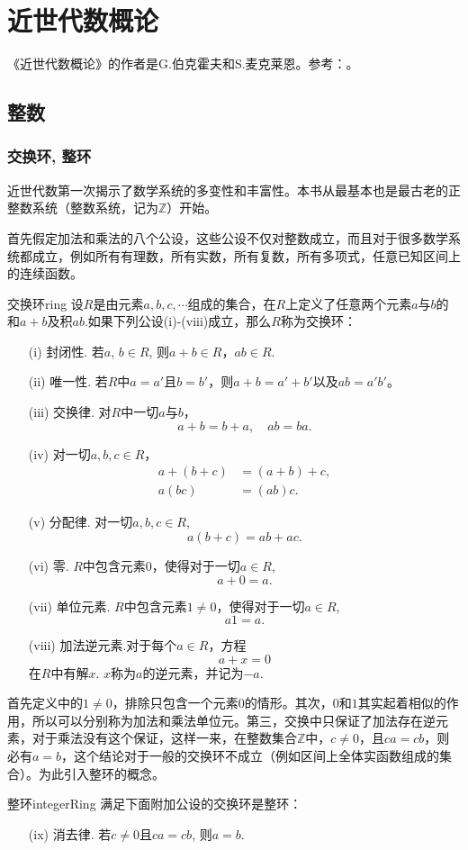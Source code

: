 \chapter{近世代数概论}
《近世代数概论》的作者是G.伯克霍夫和S.麦克莱恩。参考：\cite{surveyofmodernalgebra1979}。

\section{整数}
\subsection{交换环, 整环}
近世代数第一次揭示了数学系统的多变性和丰富性。本书从最基本也是最古老的正整数系统（整数系统，记为$\mathbb{Z}$）开始。

首先假定加法和乘法的八个公设，这些公设不仅对整数成立，而且对于很多数学系统都成立，例如所有有理数，所有实数，所有复数，所有多项式，任意已知区间上的连续函数。

\begin{definition}{交换环}{ring} 
设$R$是由元素$a,b,c,\cdots$组成的集合，在$R$上定义了任意两个元素$a$与$b$的和$a+b$及积$ab$.如果下列公设(i)-(viii)成立，那么$R$称为交换环：
\begin{enumerate}
\item[(i)] 封闭性. 若$a$, $b \in R$, 则$a+b \in R$，$ab \in R$.
\item[(ii)] 唯一性. 若$R$中$a=a'$且$b=b'$，则$a+b=a'+b'$以及$ab=a'b'$。
\item[(iii)]交换律. 对$R$中一切$a$与$b$，
\[
a+b=b+a,\quad ab=ba.
\]
\item[(iv)]对一切$a,b,c \in R$，
\[
\begin{aligned}
a + (b + c) &= (a+b)+c, \\
a(bc) &= (ab)c.
\end{aligned}
\]
\item[(v)]分配律. 对一切$a,b,c \in R$,
\[
a(b + c)=ab + ac. 
\]
\item[(vi)]零. $R$中包含元素$0$，使得对于一切$a \in R$, 
\[
a + 0 = a.
\]
\item[(vii)]单位元素. $R$中包含元素$1 \neq 0$，使得对于一切$a \in R$,
\[
a1=a.
\]
\item[(viii)]加法逆元素.对于每个$a \in R$，方程
\[
a + x = 0
\]
在$R$中有解$x$. $x$称为$a$的逆元素，并记为$-a$.
\end{enumerate}
\end{definition}

首先定义中的$1 \neq 0$，排除只包含一个元素$0$的情形。其次，$0$和$1$其实起着相似的作用，所以可以分别称为加法和乘法单位元。第三，交换中只保证了加法存在逆元素，对于乘法没有这个保证，这样一来，在整数集合$\mathbb{Z}$中，$c \neq 0$，且$ca=cb$，则必有$a=b$，这个结论对于一般的交换环不成立（例如区间上全体实函数组成的集合）。为此引入整环的概念。
\begin{definition}{整环}{integerRing} 
满足下面附加公设的交换环是整环：
\begin{enumerate}
\item[(ix)] 消去律. 若$c \neq 0$且$ca=cb$, 则$a=b$.
\end{enumerate}
\end{definition}

